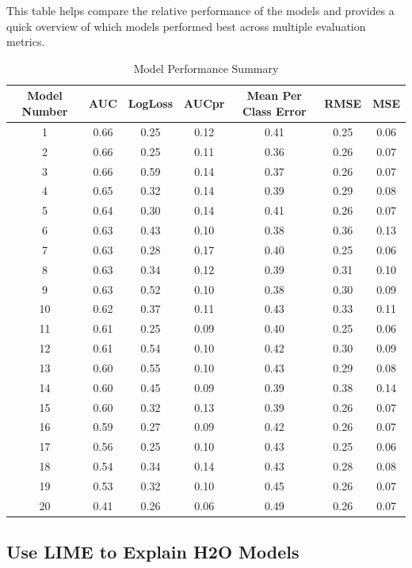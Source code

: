 \documentclass{llncs}
\begin{document}
This table helps compare the relative performance of the models and provides a quick overview of which models performed best across multiple evaluation metrics.


\begin{table}[htbp]
	\centering
	\begin{tabular}{|c|c|c|c|c|c|c|}
		\hline
		\textbf{Model Number} & \textbf{AUC} & \textbf{LogLoss} & \textbf{AUCpr} & \textbf{Mean Per Class Error} & \textbf{RMSE} & \textbf{MSE} \\
		\hline
		1 & 0.66 & 0.25 & 0.12 & 0.41 & 0.25 & 0.06 \\
		2 & 0.66 & 0.25 & 0.11 & 0.36 & 0.26 & 0.07 \\
		3 & 0.66 & 0.59 & 0.14 & 0.37 & 0.26 & 0.07 \\
		4 & 0.65 & 0.32 & 0.14 & 0.39 & 0.29 & 0.08 \\
		5 & 0.64 & 0.30 & 0.14 & 0.41 & 0.26 & 0.07 \\
		6 & 0.63 & 0.43 & 0.10 & 0.38 & 0.36 & 0.13 \\
		7 & 0.63 & 0.28 & 0.17 & 0.40 & 0.25 & 0.06 \\
		8 & 0.63 & 0.34 & 0.12 & 0.39 & 0.31 & 0.10 \\
		9 & 0.63 & 0.52 & 0.10 & 0.38 & 0.30 & 0.09 \\
		10 & 0.62 & 0.37 & 0.11 & 0.43 & 0.33 & 0.11 \\
		11 & 0.61 & 0.25 & 0.09 & 0.40 & 0.25 & 0.06 \\
		12 & 0.61 & 0.54 & 0.10 & 0.42 & 0.30 & 0.09 \\
		13 & 0.60 & 0.55 & 0.10 & 0.43 & 0.29 & 0.08 \\
		14 & 0.60 & 0.45 & 0.09 & 0.39 & 0.38 & 0.14 \\
		15 & 0.60 & 0.32 & 0.13 & 0.39 & 0.26 & 0.07 \\
		16 & 0.59 & 0.27 & 0.09 & 0.42 & 0.26 & 0.07 \\
		17 & 0.56 & 0.25 & 0.10 & 0.43 & 0.25 & 0.06 \\
		18 & 0.54 & 0.34 & 0.14 & 0.43 & 0.28 & 0.08 \\
		19 & 0.53 & 0.32 & 0.10 & 0.45 & 0.26 & 0.07 \\
		20 & 0.41 & 0.26 & 0.06 & 0.49 & 0.26 & 0.07 \\
		\hline
	\end{tabular}
	\caption{Model Performance Summary}
	\label{tab:model_performance}
\end{table}

\subsection{Use LIME to Explain H2O Models}
\end{document}
